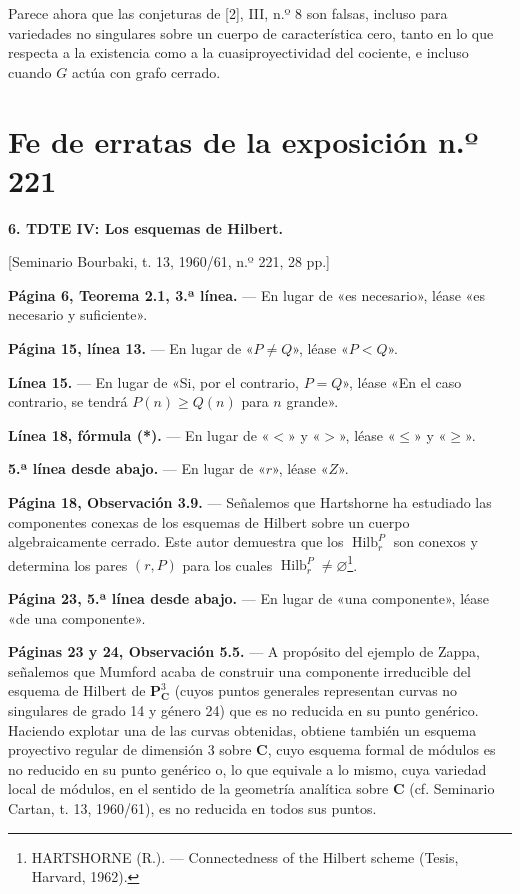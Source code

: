 \documentclass[11pt,twoside,openany]{book}
\numberwithin{equation}{section}
\newcommand{\src}[1]{%
  \phantomsection\hypertarget{src:#1}{}%
  \marginpar{\raggedleft\footnotesize\sffamily #1}%
}
\theoremstyle{plain}
\theoremstyle{definition}
\theoremstyle{remark}
\newcommand{\FgaUnitKey}{frontmatter}
\renewcommand{\src}[1]{%
  \phantomsection\hypertarget{src:\FgaUnitKey:#1}{}%
  \marginpar{\raggedleft\footnotesize\sffamily #1}%
}
\theoremstyle{plain}
\theoremstyle{definition}
\theoremstyle{remark}
\begin{document}
Parece ahora que las conjeturas de [2], III, n.º 8 son falsas, incluso para
variedades no singulares sobre un cuerpo de característica cero, tanto en lo
que respecta a la existencia como a la cuasiproyectividad del cociente, e
incluso cuando $G$ actúa con grafo cerrado.

\def\FgaUnitKey{e221}\clearpage
\chapter*{Fe de erratas de la exposición n.º 221}
\setcounter{footnote}{3}
\src{302}

\noindent\textbf{6. TDTE IV: Los esquemas de Hilbert.}

\begin{center}
[Seminario Bourbaki, t. 13, 1960/61, n.º 221, 28 pp.]
\end{center}

\noindent\textbf{Página 6, Teorema 2.1, 3.ª línea.} --- En lugar de
«es necesario», léase «es necesario y suficiente».

\noindent\textbf{Página 15, línea 13.} --- En lugar de «$P\neq Q$», léase
«$P<Q$».

\noindent\textbf{Línea 15.} --- En lugar de «Si, por el contrario, $P=Q$»,
léase «En el caso contrario, se tendrá $P(n)\geq Q(n)$ para $n$ grande».

\noindent\textbf{Línea 18, fórmula (*).} --- En lugar de «$<$» y «$>$»,
léase «$\leq$» y «$\geq$».

\noindent\textbf{5.ª línea desde abajo.} --- En lugar de «$r$», léase «$Z$».

\noindent\textbf{Página 18, Observación 3.9.} --- Señalemos que Hartshorne ha
estudiado las componentes conexas de los esquemas de Hilbert sobre un cuerpo
algebraicamente cerrado. Este autor demuestra que los
$\operatorname{Hilb}^{P}_{r}$ son conexos y determina los pares $(r,P)$ para
los cuales $\operatorname{Hilb}^{P}_{r}\neq\varnothing$\footnote{HARTSHORNE
(R.). --- Connectedness of the Hilbert scheme (Tesis, Harvard, 1962).}.

\noindent\textbf{Página 23, 5.ª línea desde abajo.} --- En lugar de «una
componente», léase «de una componente».

\noindent\textbf{Páginas 23 y 24, Observación 5.5.} --- A propósito del ejemplo
de Zappa, señalemos que Mumford acaba de construir una componente irreducible
del esquema de Hilbert de $\mathbf P^3_{\mathbf C}$ (cuyos puntos generales
representan curvas no singulares de grado 14 y género 24) que es no reducida
en su punto genérico. Haciendo explotar una de las curvas obtenidas, obtiene
también un esquema proyectivo regular de dimensión 3 sobre $\mathbf C$, cuyo
esquema formal de módulos es no reducido en su punto genérico o, lo que
equivale a lo mismo, cuya variedad local de módulos, en el sentido de la
geometría analítica sobre $\mathbf C$ (cf. Seminario Cartan, t. 13, 1960/61),
es no reducida en todos sus puntos.
\end{document}
